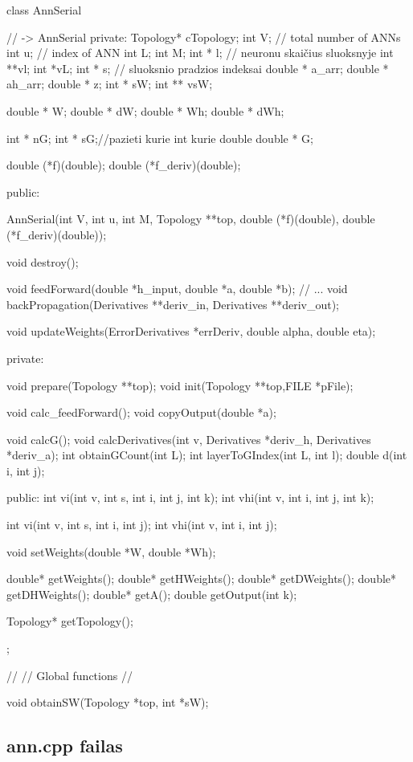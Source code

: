 class AnnSerial{ // -> AnnSerial
private:
  Topology* cTopology;
  int V; // total number of ANNs
  int u; // index of ANN
  int L;
  int M;
  int * l; // neuronu skaičius sluoksnyje
  int **vl;
  int *vL;
  int * s; // sluoksnio pradzios indeksai
  double * a\_arr;
  double * ah\_arr;
  double * z;
  int * sW;
  int ** vsW;

  double * W;
  double * dW;
  double * Wh;
  double * dWh;


  int * nG;
  int * sG;//pazieti kurie int kurie double
  double * G;

  double (*f)(double);
  double (*f\_deriv)(double);


public:

  AnnSerial(int V, int u, int M, Topology **top,  double (*f)(double), double (*f\_deriv)(double));

  void destroy();

  void feedForward(double *h\_input, double *a, double *b); // ...
  void backPropagation(Derivatives **deriv\_in, Derivatives **deriv\_out);

  void updateWeights(ErrorDerivatives *errDeriv, double alpha, double eta);

private:

  void prepare(Topology **top);
  void init(Topology **top,FILE *pFile);

  void calc\_feedForward();
  void copyOutput(double *a);

  void calcG();
  void calcDerivatives(int v, Derivatives *deriv\_h, Derivatives *deriv\_a);
  int obtainGCount(int L);
  int layerToGIndex(int L, int l);
  double d(int i, int j);

public:
  int vi(int v, int s, int i, int j, int k);
  int vhi(int v, int i, int j, int k);

  int vi(int v, int s, int i, int j);
  int vhi(int v, int i, int j);


  void setWeights(double *W, double *Wh);

  double* getWeights();
  double* getHWeights();
  double* getDWeights();
  double* getDHWeights();
  double* getA();
  double getOutput(int k);

  Topology* getTopology();
};

//
// Global functions
//

void obtainSW(Topology *top, int *sW);


\subsection{ann.cpp failas}


